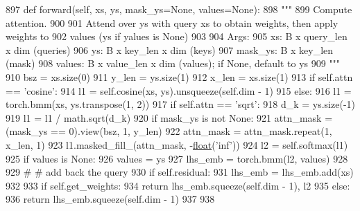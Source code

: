 \begin{DoxyCode}
897     \textcolor{keyword}{def }forward(self, xs, ys, mask\_ys=None, values=None):
898         \textcolor{stringliteral}{"""}
899 \textcolor{stringliteral}{        Compute attention.}
900 \textcolor{stringliteral}{}
901 \textcolor{stringliteral}{        Attend over ys with query xs to obtain weights, then apply weights to}
902 \textcolor{stringliteral}{        values (ys if yalues is None)}
903 \textcolor{stringliteral}{}
904 \textcolor{stringliteral}{        Args:}
905 \textcolor{stringliteral}{            xs: B x query\_len x dim (queries)}
906 \textcolor{stringliteral}{            ys: B x key\_len x dim (keys)}
907 \textcolor{stringliteral}{            mask\_ys: B x key\_len (mask)}
908 \textcolor{stringliteral}{            values: B x value\_len x dim (values); if None, default to ys}
909 \textcolor{stringliteral}{        """}
910         bsz = xs.size(0)
911         y\_len = ys.size(1)
912         x\_len = xs.size(1)
913         \textcolor{keywordflow}{if} self.attn == \textcolor{stringliteral}{'cosine'}:
914             l1 = self.cosine(xs, ys).unsqueeze(self.dim - 1)
915         \textcolor{keywordflow}{else}:
916             l1 = torch.bmm(xs, ys.transpose(1, 2))
917             \textcolor{keywordflow}{if} self.attn == \textcolor{stringliteral}{'sqrt'}:
918                 d\_k = ys.size(-1)
919                 l1 = l1 / math.sqrt(d\_k)
920         \textcolor{keywordflow}{if} mask\_ys \textcolor{keywordflow}{is} \textcolor{keywordflow}{not} \textcolor{keywordtype}{None}:
921             attn\_mask = (mask\_ys == 0).view(bsz, 1, y\_len)
922             attn\_mask = attn\_mask.repeat(1, x\_len, 1)
923             l1.masked\_fill\_(attn\_mask, -\hyperlink{namespaceprojects_1_1controllable__dialogue_1_1make__control__dataset_aa2b7207688c641dbc094ab44eca27113}{float}(\textcolor{stringliteral}{'inf'}))
924         l2 = self.softmax(l1)
925         \textcolor{keywordflow}{if} values \textcolor{keywordflow}{is} \textcolor{keywordtype}{None}:
926             values = ys
927         lhs\_emb = torch.bmm(l2, values)
928 
929         \textcolor{comment}{# # add back the query}
930         \textcolor{keywordflow}{if} self.residual:
931             lhs\_emb = lhs\_emb.add(xs)
932 
933         \textcolor{keywordflow}{if} self.get\_weights:
934             \textcolor{keywordflow}{return} lhs\_emb.squeeze(self.dim - 1), l2
935         \textcolor{keywordflow}{else}:
936             \textcolor{keywordflow}{return} lhs\_emb.squeeze(self.dim - 1)
937 
938 
\end{DoxyCode}


